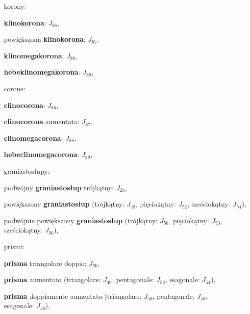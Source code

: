 \begin{compactitem}
\begin{compactitem}
\begin{compactitem}
\begin{compactitem}
\begin{compactitem}
\begin{compactitem}
    \item korony: \begin{compactitem} %
        \item \textbf{klinokorona}: $J_{86}$, %
        \item powiększona \textbf{klinokorona}: $J_{87}$, %
        \item \textbf{klinomegakorona}: $J_{88}$, %
        \item \textbf{hebeklinomegakorona}: $J_{89}$, %
    \item corone: \begin{compactitem} %
        \item \textbf{clinocorona}: $J_{86}$, %
        \item \textbf{clinocorona} aumentata: $J_{87}$, %
        \item \textbf{clinomegacorona}: $J_{88}$, %
        \item \textbf{hebeclinomegacorona}: $J_{89}$, %
    \end{compactitem}
    \item graniastosłupy: \begin{compactitem} %
        \item podwójny \textbf{graniastosłup} trójkątny: $J_{26}$, %
        \item powiększony \textbf{graniastosłup} (trójkątny: $J_{49}$, pięciokątny: $J_{52}$, sześciokątny: $J_{54}$), %
        \item podwójnie powiększony \textbf{graniastosłup} (trójkątny: $J_{50}$, pięciokątny: $J_{53}$, \\ %
        sześciokątny: $J_{56}$), %
    \item prismi: \begin{compactitem} %
        \item \textbf{prisma} triangolare doppio: $J_{26}$, %
        \item \textbf{prisma} aumentato (triangolare: $J_{49}$, pentagonale: $J_{52}$, esagonale: $J_{54}$), %
        \item \textbf{prisma} doppiamente aumentato (triangolare: $J_{50}$, pentagonale: $J_{53}$, \\ %
        esagonale: $J_{56}$), %


\end{compactitem}
\end{compactitem}
\end{compactitem}
\end{compactitem}
\end{compactitem}
\end{compactitem}
\end{compactitem}
\end{compactitem}
\end{compactitem}
